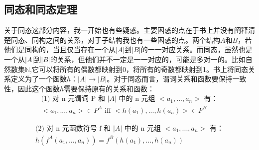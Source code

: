 \documentclass{article}
\begin{document}
\subsection{同态和同态定理 }
关于同态这部分内容，我一开始也有些疑惑。主要困惑的点在于书上并没有阐释清楚同态、同构之间的关系，对于子结构我也有一些困惑的点。两个结构$A$和$B$，若他们是同构的，当且仅当存在一个从$|A|$到$|B|$的一一对应关系。而同态，虽然也是一个从$|A|$到$|B|$的关系，但他们并不一定是一一对应的，可能是多对一的。比如自然数集$\mathbb{N}$,它可以将所有的偶数都映射到0，将所有的奇数都映射到1。书上将同态关系定义为了一个函数$h$：$|A| \rightarrow |B|$。对于同态而言，谓词关系和函数要保持一致性，因此这个函数$h$需要保持原有的关系和函数：
\[
\begin{gathered}
    \text{(1) 对 n 元谓词 P 和 } |A| \text{ 中的 n 元组 } <a_1,...,a_n> \text{ 有：} \\
    <a_1,...,a_n> \in P^A \text{ iff } <h(a_1),...,h(a_n)> \in P^B
\end{gathered}
\]

\[
\begin{gathered}
    \text{(2) 对 n 元函数符号 f 和 } |A| \text{ 中的 n 元组 } <a_1,...,a_n> \text{ 有：} \\
    h(f^A(a_1,...,a_n)) = f^B(h(a_1),...,h(a_n))
\end{gathered}
\]
\end{document}
